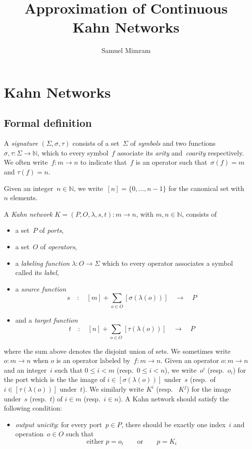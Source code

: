 \documentclass{article}
\title{Approximation of Continuous Kahn Networks}
\author{Samuel Mimram}
\newcommand{\N}{\mathbb{N}}
\newcommand{\intset}[1]{[#1]}
\newcommand{\resp}{resp.~}
\newcommand{\qqtext}[1]{\qquad\text{#1}\qquad}
\newcommand{\qto}{\quad\to\quad}
\newcommand{\qcolon}{\quad:\quad}
\begin{document}
\maketitle

\section{Kahn Networks}
\subsection{Formal definition}
A \emph{signature} $(\Sigma,\sigma,\tau)$ consists of a set~$\Sigma$ of
\emph{symbols} and two functions \hbox{$\sigma,\tau:\Sigma\to\N$}, which to
every symbol~$f$ associate its \emph{arity} and~\emph{coarity} respectively. We
often write~$f:m\to n$ to indicate that~$f$ is an operator such that~$\sigma(f)=m$
and \hbox{$\tau(f)=n$}.

Given an integer~$n\in\N$, we write~$\intset{n}=\{0,\ldots,n-1\}$ for the
canonical set with~$n$ elements.

A \emph{Kahn network} $K=(P,O,\lambda,s,t):m\to n$, with $m,n\in\N$, consists of
\begin{itemize}
\item a set~$P$ of \emph{ports},
\item a set~$O$ of \emph{operators},
\item a \emph{labeling function} $\lambda:O\to\Sigma$ which to every operator
  associates a symbol called its \emph{label},
\item a \emph{source function}
  \[
  s\qcolon\intset{m}+\sum_{o\in O}\intset{\sigma(\lambda(o))}\qto P
  \]
\item and a \emph{target function}
  \[
  t\qcolon \intset{n}+\sum_{o\in O}\intset{\tau(\lambda(o))}\qto P
  \]
\end{itemize}
where the sum above denotes the disjoint union of sets. We sometimes write
$o:m\to n$ when $o$ is an operator labeled by~$f:m\to n$. Given an operator
\hbox{$o:m\to n$} and an integer~$i$ such that $0\leq i<m$ (\resp $0\leq i<n$),
we write~$o^i$ (\resp $o_i$) for the port which is the the image of
$i\in\intset{\sigma(\lambda(o))}$ under~$s$ (\resp of
$i\in\intset{\tau(\lambda(o))}$ under~$t$). We similarly write $K^i$ (\resp
$K^j$) for the image under~$s$ (\resp $t$) of $i\in m$ (\resp $i\in n$). A Kahn
network should satisfy the following condition:
\begin{itemize}
\item \emph{output unicity}: for every port~$p\in P$, there should be exactly
  one index~$i$ and operation~$o\in O$ such that
  \[
  \text{either } p=o_i \qqtext{or} p=K_i
  \]
\end{itemize}
\end{document}
